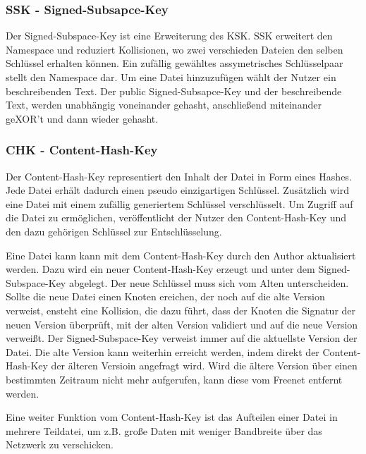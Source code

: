 \subsubsection{SSK - Signed-Subsapce-Key}
Der Signed-Subspace-Key ist eine Erweiterung des KSK. SSK erweitert den
Namespace und reduziert Kollisionen, wo zwei verschieden Dateien den
selben Schlüssel erhalten können.
Ein zufällig gewähltes assymetrisches Schlüsselpaar stellt den Namespace dar.
Um eine Datei hinzuzufügen wählt der Nutzer ein beschreibenden Text. Der
public Signed-Subsapce-Key und der beschreibende Text, werden unabhängig
voneinander gehasht, anschließend miteinander geXOR't und dann wieder gehasht.

\subsubsection{CHK - Content-Hash-Key}
Der Content-Hash-Key representiert den Inhalt der Datei in Form eines Hashes.
Jede Datei erhält dadurch einen pseudo einzigartigen Schlüssel. Zusätzlich wird
eine Datei mit einem zufällig generiertem Schlüssel verschlüsselt.
Um Zugriff auf die Datei zu ermöglichen, veröffentlicht der Nutzer den
Content-Hash-Key und den dazu gehörigen Schlüssel zur Entschlüsselung.

Eine Datei kann kann mit dem Content-Hash-Key durch den Author aktualisiert
werden. Dazu wird ein neuer Content-Hash-Key erzeugt und unter dem
Signed-Subspace-Key abgelegt. Der neue Schlüssel muss sich vom Alten
unterscheiden. Sollte die neue Datei einen Knoten ereichen, der noch auf die
alte Version verweist, ensteht eine Kollision, die dazu führt, dass der Knoten
die Signatur der neuen Version überprüft, mit der alten Version validiert und
auf die neue Version verweißt. Der Signed-Subspace-Key
verweist immer auf die aktuellste Version der Datei. Die alte Version kann
weiterhin erreicht werden, indem direkt der Content-Hash-Key der älteren
Versioin angefragt wird.  Wird die ältere Version über einen bestimmten
Zeitraum nicht mehr aufgerufen, kann diese vom Freenet entfernt werden.

Eine weiter Funktion vom Content-Hash-Key ist das Aufteilen einer Datei
in mehrere Teildatei, um z.B. große Daten mit weniger Bandbreite über das
Netzwerk zu verschicken.
